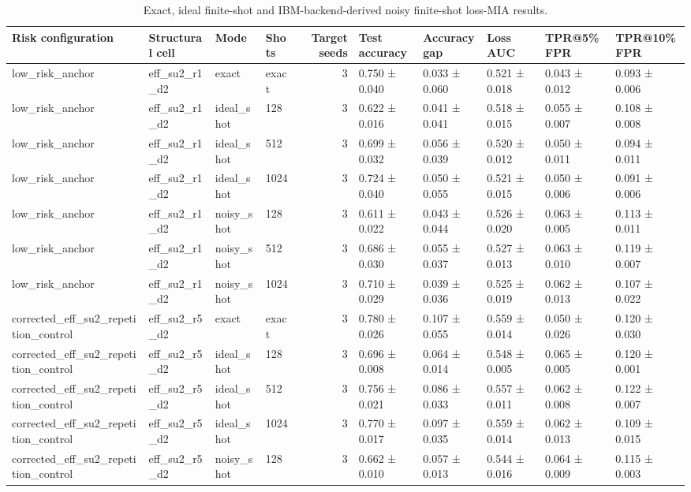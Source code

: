 \begin{table}[t]
\caption{Exact, ideal finite-shot and IBM-backend-derived noisy finite-shot loss-MIA results.}
\label{tab:noisy-conditions}
\begin{tabular}{llllrlllll}
\toprule
Risk configuration & Structural cell & Mode & Shots & Target seeds & Test accuracy & Accuracy gap & Loss AUC & TPR@5\% FPR & TPR@10\% FPR \\
\midrule
low\_risk\_anchor & eff\_su2\_r1\_d2 & exact & exact & 3 & 0.750 ± 0.040 & 0.033 ± 0.060 & 0.521 ± 0.018 & 0.043 ± 0.012 & 0.093 ± 0.006 \\
low\_risk\_anchor & eff\_su2\_r1\_d2 & ideal\_shot & 128 & 3 & 0.622 ± 0.016 & 0.041 ± 0.041 & 0.518 ± 0.015 & 0.055 ± 0.007 & 0.108 ± 0.008 \\
low\_risk\_anchor & eff\_su2\_r1\_d2 & ideal\_shot & 512 & 3 & 0.699 ± 0.032 & 0.056 ± 0.039 & 0.520 ± 0.012 & 0.050 ± 0.011 & 0.094 ± 0.011 \\
low\_risk\_anchor & eff\_su2\_r1\_d2 & ideal\_shot & 1024 & 3 & 0.724 ± 0.040 & 0.050 ± 0.055 & 0.521 ± 0.015 & 0.050 ± 0.006 & 0.091 ± 0.006 \\
low\_risk\_anchor & eff\_su2\_r1\_d2 & noisy\_shot & 128 & 3 & 0.611 ± 0.022 & 0.043 ± 0.044 & 0.526 ± 0.020 & 0.063 ± 0.005 & 0.113 ± 0.011 \\
low\_risk\_anchor & eff\_su2\_r1\_d2 & noisy\_shot & 512 & 3 & 0.686 ± 0.030 & 0.055 ± 0.037 & 0.527 ± 0.013 & 0.063 ± 0.010 & 0.119 ± 0.007 \\
low\_risk\_anchor & eff\_su2\_r1\_d2 & noisy\_shot & 1024 & 3 & 0.710 ± 0.029 & 0.039 ± 0.036 & 0.525 ± 0.019 & 0.062 ± 0.013 & 0.107 ± 0.022 \\
corrected\_eff\_su2\_repetition\_control & eff\_su2\_r5\_d2 & exact & exact & 3 & 0.780 ± 0.026 & 0.107 ± 0.055 & 0.559 ± 0.014 & 0.050 ± 0.026 & 0.120 ± 0.030 \\
corrected\_eff\_su2\_repetition\_control & eff\_su2\_r5\_d2 & ideal\_shot & 128 & 3 & 0.696 ± 0.008 & 0.064 ± 0.014 & 0.548 ± 0.005 & 0.065 ± 0.005 & 0.120 ± 0.001 \\
corrected\_eff\_su2\_repetition\_control & eff\_su2\_r5\_d2 & ideal\_shot & 512 & 3 & 0.756 ± 0.021 & 0.086 ± 0.033 & 0.557 ± 0.011 & 0.062 ± 0.008 & 0.122 ± 0.007 \\
corrected\_eff\_su2\_repetition\_control & eff\_su2\_r5\_d2 & ideal\_shot & 1024 & 3 & 0.770 ± 0.017 & 0.097 ± 0.035 & 0.559 ± 0.014 & 0.062 ± 0.013 & 0.109 ± 0.015 \\
corrected\_eff\_su2\_repetition\_control & eff\_su2\_r5\_d2 & noisy\_shot & 128 & 3 & 0.662 ± 0.010 & 0.057 ± 0.013 & 0.544 ± 0.016 & 0.064 ± 0.009 & 0.115 ± 0.003 \\

\end{tabular}
\end{table}
